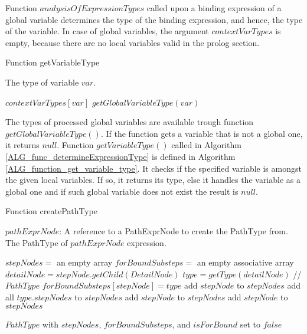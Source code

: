 Function $analysisOfExpressionTypes$ called upon a binding expression of a global variable determines the type of the binding expression, and hence, the type of the variable. In case of global variables, the argument $contextVarTypes$ is empty, because there are no local variables valid in the prolog section.

\begin{algorithm}
\caption{Function getVariableType}
\label{ALG_function_get_variable_type}
\begin{algorithmic}[1]
\ENSURE The type of variable $var$.

     \RETURN $contextVarTypes[var]$
\ELSE
     \RETURN $getGlobalVariableType(var)$
\ENDIF
\end{algorithmic}
\end{algorithm}

The types of processed global variables are available trough function \linebreak $getGlobalVariableType()$. If the function gets a variable that is not a global one, it returns $null$. Function $getVariableType()$ called in Algorithm \ref{ALG_func_determineExpressionType} is defined in Algorithm \ref{ALG_function_get_variable_type}. It checks if the specified variable is amongst the given local variables. If so, it returns its type, else it handles the variable as a global one and if such global variable does not exist the result is $null$.

\begin{algorithm}
\caption{Function createPathType}
\label{ALG_function_create_path_type}
\begin{algorithmic}[1]
\REQUIRE $pathExprNode$: A reference to a PathExprNode to create the PathType from.
\ENSURE The PathType of $pathExprNode$ expression.

\STATE $stepNodes =$ an empty array
\STATE $forBoundSubsteps =$ an empty associative array
	\STATE $detailNode = stepNode.getChild(DetailNode)$
			\STATE $type = getType(detailNode)$ // $PathType$
				\STATE $forBoundSubsteps[stepNode] = type$
				\STATE add $stepNode$ to $stepNodes$
			\ELSE
				\STATE add all $type.stepNodes$ to $stepNodes$
			\ENDIF
		\ELSE
			\STATE add $stepNode$ to $stepNodes$
		\ENDIF
	\ELSE
		\STATE add $stepNode$ to $stepNodes$
	\ENDIF
\ENDFOR

\RETURN $PathType$ with $stepNodes$, $forBoundSubsteps$, and $isForBound$ set to $false$
\end{algorithmic}
\end{algorithm}

